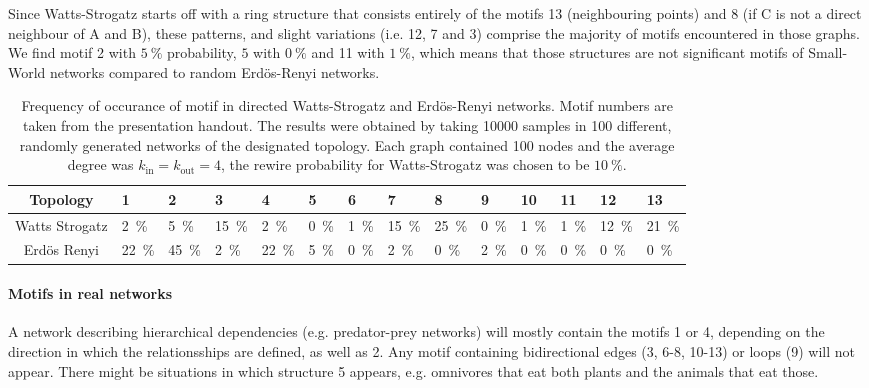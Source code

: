 \documentclass{scrartcl}
\begin{document}
Since Watts-Strogatz starts off with a ring structure that consists
entirely of the motifs 13 (neighbouring points) and 8 (if C is not a direct
neighbour of A and B), these patterns, and slight variations (i.e. 12,
7 and 3) comprise the majority of motifs encountered in those graphs. We
find motif 2 with $\SI{5}{\percent}$ probability, $5$ with
$\SI{0}{\percent}$ and 11 with $\SI{1}{\percent}$, which means that those
structures are not significant motifs of Small-World networks compared to
random Erdös-Renyi networks.

\begin{table}
	\centering
		\begin{tabular}{c|*{13}{l}}
		\toprule
		Topology & \num{1} & 2 & 3 & 4 & 5 &6 & 7 & 8 & 9 & 10 &11 & 12& 13  \\ \midrule
		Watts Strogatz & \SI{2}{\percent} & \SI{5}{\percent} & \SI{15}{\percent} & \SI{2}{\percent} & \SI{0}{\percent} & \SI{1}{\percent} & \SI{15}{\percent} & \SI{25}{\percent} & \SI{0}{\percent} & \SI{1}{\percent} & \SI{1}{\percent} & \SI{12}{\percent} & \SI{21}{\percent} \\
		Erdös Renyi & \SI{22}{\percent} & \SI{45}{\percent} & \SI{2}{\percent} & \SI{22}{\percent} & \SI{5}{\percent} & \SI{0}{\percent} & \SI{2}{\percent} & \SI{0}{\percent} & \SI{2}{\percent} & \SI{0}{\percent} & \SI{0}{\percent} & \SI{0}{\percent} & \SI{0}{\percent}\\
		\bottomrule
		\end{tabular}
	\caption{Frequency of occurance of motif in directed Watts-Strogatz and Erdös-Renyi networks. Motif numbers are taken from the presentation handout. The results were obtained by taking 10000 samples in 100 different, randomly generated networks of the designated topology. Each graph contained 100 nodes and the average degree was $k_{\mathrm{in}} = k_{\mathrm{out}}=4$, the rewire probability for Watts-Strogatz was chosen to be $\SI{10}{\percent}$.}
	\label{tab:motifs}
\end{table}

\paragraph{Motifs in real networks}
A network describing hierarchical dependencies (e.g. predator-prey networks) will mostly contain the motifs 1 or 4, depending on the direction in which the relationsships are defined, as well as 2. Any motif containing bidirectional edges (3, 6-8, 10-13) or loops (9) will not appear. There might be situations in which structure 5 appears, e.g. omnivores that eat both plants and the animals that eat those.
\end{document}

